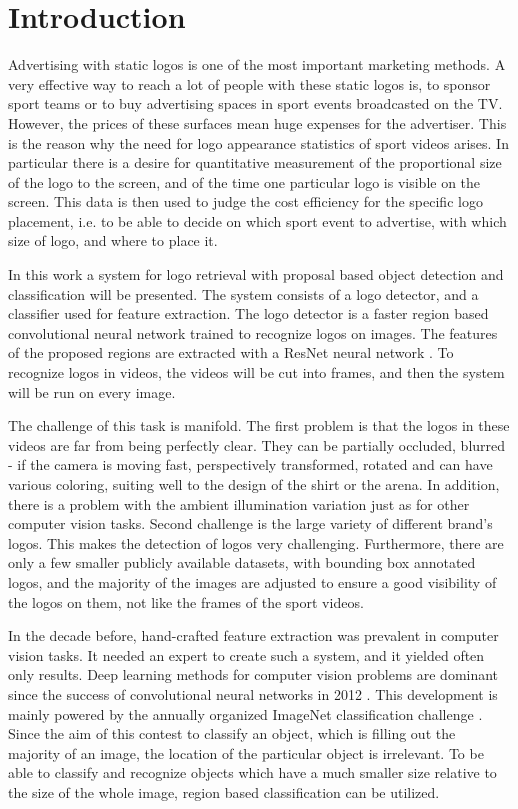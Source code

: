 \chapter{Introduction}

Advertising with static logos is one of the most important marketing methods. A very effective way to reach a lot of people with these static logos is, to sponsor sport teams or to buy advertising spaces in sport events broadcasted on the TV. However, the prices of these surfaces mean huge expenses for the advertiser. This is the reason why the need for logo appearance statistics of sport videos arises. In particular there is a desire for quantitative measurement of the proportional size of the logo to the screen, and of the time one particular logo is visible on the screen. This data is then used to judge the cost efficiency for the specific logo placement, i.e. to be able to decide on which sport event to advertise, with which size of logo, and where to place it.

In this work a system for logo retrieval with proposal based object detection and classification will be presented. The system consists of a logo detector, and a classifier used for feature extraction. The logo detector is a faster region based convolutional neural network \cite{NIPS2015_5638} trained to recognize logos on images. The features of the proposed regions are extracted with a ResNet neural network \cite{DBLP:journals/corr/HeZRS15}. To recognize logos in videos, the videos will be cut into frames, and then the system will be run on every image.

The challenge of this task is manifold. The first problem is that the logos in these videos are far from being perfectly clear. They can be partially occluded, blurred - if the camera is moving fast, perspectively transformed, rotated and can have various coloring, suiting well to the design of the shirt or the arena. In addition, there is a problem with the ambient illumination variation just as for other computer vision tasks.
Second challenge is the large variety of different brand's logos. This makes the detection of logos very challenging.
Furthermore, there are only a few smaller publicly available datasets, with bounding box annotated logos, and the majority of the images are adjusted to ensure a good visibility of the logos on them, not like the frames of the sport videos.

In the decade before, hand-crafted feature extraction was prevalent in computer vision tasks. It needed an expert to create such a system, and it yielded often only results. Deep learning methods for computer vision problems are dominant since the success of convolutional neural networks in 2012 \cite{NIPS2012_4824}. This development is mainly powered by the annually organized ImageNet classification challenge \cite{ILSVRC15}. Since the aim of this contest to classify an object, which is filling out the majority of an image, the location of the particular object is irrelevant. To be able to classify and recognize objects which have a much smaller size relative to the size of the whole image, region based classification can be utilized.

